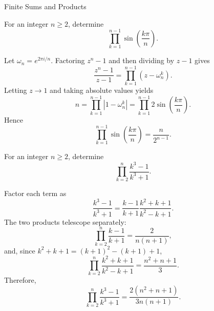 \begin{expectedproblemgroup}{Finite Sums and Products}
        \begin{expectedsubproblem}
            For an integer $n\geq2$, determine
            \[
                \prod_{k=1}^{n-1}\sin\left(\frac{k\pi}{n}\right).
            \]
        \end{expectedsubproblem}

        \begin{expectedsubsolution}
            Let $\omega_n=e^{2\pi i/n}$. Factoring $z^n-1$ and then dividing by
            $z-1$ gives
            \[
                \frac{z^n-1}{z-1}
                =
                \prod_{k=1}^{n-1}(z-\omega_n^k).
            \]
            Letting $z\to1$ and taking absolute values yields
            \[
                n
                =
                \prod_{k=1}^{n-1}|1-\omega_n^k|
                =
                \prod_{k=1}^{n-1}
                2\sin\left(\frac{k\pi}{n}\right).
            \]
            Hence
            \[
                \boxed{
                    \prod_{k=1}^{n-1}
                    \sin\left(\frac{k\pi}{n}\right)
                    =
                    \frac{n}{2^{n-1}}
                }.
            \]
        \end{expectedsubsolution}

        \begin{expectedsubproblem}
            For an integer $n\geq2$, determine
            \[
                \prod_{k=2}^{n}\frac{k^3-1}{k^3+1}.
            \]
        \end{expectedsubproblem}

        \begin{expectedsubsolution}
            Factor each term as
            \[
                \frac{k^3-1}{k^3+1}
                =
                \frac{k-1}{k+1}
                \frac{k^2+k+1}{k^2-k+1}.
            \]
            The two products telescope separately:
            \[
                \prod_{k=2}^{n}\frac{k-1}{k+1}
                =
                \frac{2}{n(n+1)},
            \]
            and, since $k^2+k+1=(k+1)^2-(k+1)+1$,
            \[
                \prod_{k=2}^{n}
                \frac{k^2+k+1}{k^2-k+1}
                =
                \frac{n^2+n+1}{3}.
            \]
            Therefore,
            \[
                \boxed{
                    \prod_{k=2}^{n}\frac{k^3-1}{k^3+1}
                    =
                    \frac{2(n^2+n+1)}{3n(n+1)}
                }.
            \]
        \end{expectedsubsolution}


\end{expectedproblemgroup}

